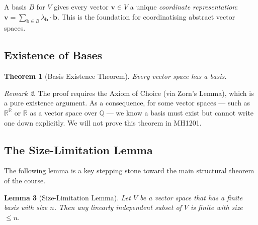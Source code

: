 \documentclass[11pt, a4paper, notitlepage]{report}
\newtheorem{theorem}{Theorem}[section]
\newtheorem{lemma}[theorem]{Lemma}
\theoremstyle{definition}
\theoremstyle{remark}
\newtheorem{remark}[theorem]{Remark}
\begin{document}
\begin{keyresult}[title={Key Result: Coordinates with Respect to a Basis}]
A basis $B$ for $V$ gives every vector $\mathbf{v}\in V$ a unique \emph{coordinate representation}: $\mathbf{v} = \sum_{\mathbf{b}\in B}\lambda_\mathbf{b}\cdot\mathbf{b}$. This is the foundation for coordinatising abstract vector spaces.
\end{keyresult}

\subsection{Existence of Bases}

\begin{theorem}[Basis Existence Theorem]\label{thm:basis-existence}
Every vector space has a basis.
\end{theorem}

\begin{remark}
The proof requires the Axiom of Choice (via Zorn's Lemma), which is a pure existence argument. As a consequence, for some vector spaces — such as $\mathbb{R}^\mathbb{R}$ or $\mathbb{R}$ as a vector space over $\mathbb{Q}$ — we know a basis must exist but cannot write one down explicitly. We will not prove this theorem in MH1201.
\end{remark}

\subsection{The Size-Limitation Lemma}

The following lemma is a key stepping stone toward the main structural theorem of the course.

\begin{lemma}[Size-Limitation Lemma]\label{lem:size-limitation}
Let $V$ be a vector space that has a finite basis with size $n$. Then any linearly independent subset of $V$ is finite with size $\leq n$.
\end{lemma}
\end{document}
